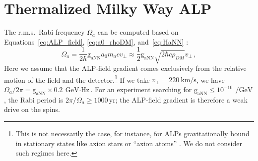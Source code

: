 
\section{Thermalized Milky Way ALP}\label{sec:theory:MWALP}



The r.m.s.\ Rabi frequency $\Omega_a$ can be computed based on Equations~\eqref{eq:ALP_field}, \eqref{eq:a0_rhoDM}, and~\eqref{eq:HaNN} \cite{Centers2021Stochastic}:
\begin{equation}
    \Omega_a = \dfrac{1}{2\hbar} \mathrm{g_{aNN}} a_0 m_a c v_{\bot} \approx \dfrac{1}{2} \mathrm{g_{aNN}} \sqrt{2\hbar c \rho_{DM}} v_{\bot}
    \,,
    \label{eq:Omega_a_MW}
\end{equation}
Here we assume that the ALP-field gradient comes exclusively from the relative motion of the field and the detector.\footnote{This is not necessarily the case, for instance, for ALPs gravitationally bound in stationary states like axion stars or ``axion atoms'' \cite{Lam2017_PhysRevD, Liang_Zhitnitsky2019_GravitationallyPhysRevD}. We do not consider such regimes here.}
If we take $v_{\bot} = \SI{220}{\km\per\second}$, we have $\Omega_a/2\pi=\mathrm{g_{aNN}}\times\SI{0.2}{\GeV\cdot\Hz}$. For an experiment searching for $\mathrm{g_{aNN}}\leq 10^{-10}\,\SI{}{\per\GeV}$, the Rabi period is $2\pi/\Omega_a \geq 1000\,\mathrm{yr}$; the ALP-field gradient is therefore a weak drive on the spins.


